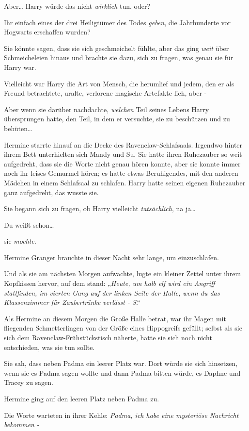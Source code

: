 {Aber… Harry würde das nicht \emph{wirklich} tun, oder?

Ihr einfach eines der drei Heiligtümer des Todes \emph{geben}, die Jahrhunderte vor Hogwarts erschaffen wurden?

Sie könnte sagen, dass sie sich geschmeichelt fühlte, aber das ging \emph{weit} über Schmeicheleien hinaus und brachte sie dazu, sich zu fragen, was genau sie für Harry war.

Vielleicht war Harry die Art von Mensch, die herumlief und jedem, den er als Freund betrachtete, uralte, verlorene magische Artefakte lieh, aber -

Aber wenn sie darüber nachdachte, \emph{welchen} Teil seines Lebens Harry übersprungen hatte, den Teil, in dem er versuchte, sie zu beschützen und zu behüten…

Hermine starrte hinauf an die Decke des Ravenclaw-Schlafsaals. Irgendwo hinter ihrem Bett unterhielten sich Mandy und Su. Sie hatte ihren Ruhezauber so weit aufgedreht, dass sie die Worte nicht genau hören konnte, aber sie konnte immer noch ihr leises Gemurmel hören; es hatte etwas Beruhigendes, mit den anderen Mädchen in einem Schlafsaal zu schlafen. Harry hatte seinen eigenen Ruhezauber ganz aufgedreht, das wusste sie.

Sie begann sich zu fragen, ob Harry vielleicht \emph{tatsächlich}, na ja…

Du weißt schon…

sie \emph{mochte}.

Hermine Granger brauchte in dieser Nacht sehr lange, um einzuschlafen.

Und als sie am nächsten Morgen aufwachte, lugte ein kleiner Zettel unter ihrem Kopfkissen hervor, auf dem stand: „\emph{Heute, um halb elf wird ein Angriff stattfinden, im vierten Gang auf der linken Seite der Halle, wenn du das Klassenzimmer für Zaubertränke verlässt - S}.“

Als Hermine an diesem Morgen die Große Halle betrat, war ihr Magen mit fliegenden Schmetterlingen von der Größe eines Hippogreifs gefüllt; selbst als sie sich dem Ravenclaw-Frühstückstisch näherte, hatte sie sich noch nicht entschieden, was sie tun sollte.

Sie sah, dass neben Padma ein leerer Platz war. Dort würde sie sich hinsetzen, wenn sie es Padma sagen wollte und dann Padma bitten würde, es Daphne und Tracey zu sagen.

Hermine ging auf den leeren Platz neben Padma zu.

Die Worte warteten in ihrer Kehle: \emph{Padma, ich habe eine mysteriöse Nachricht bekommen} \emph{-}

}

